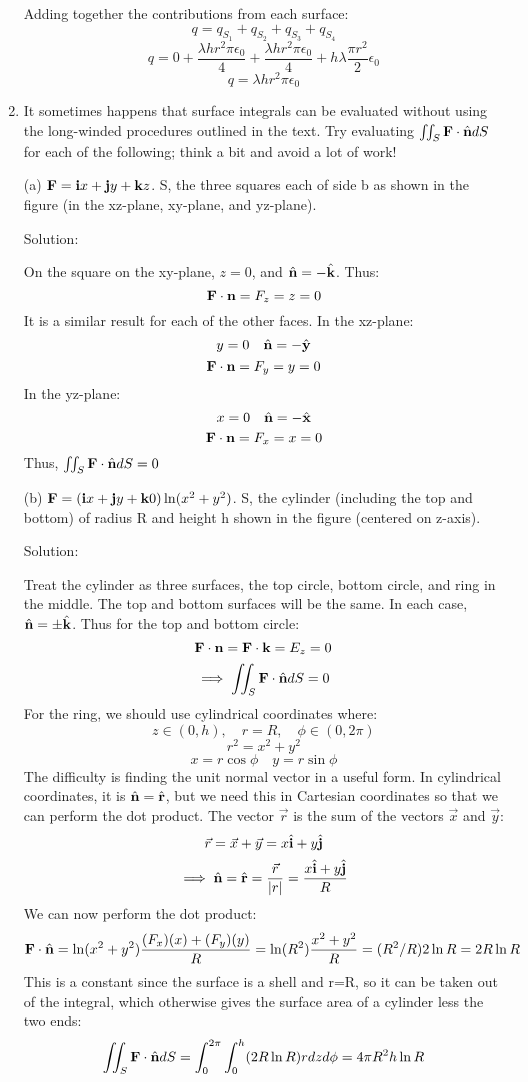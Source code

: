 \documentclass{article}
\begin{document}
\begin{enumerate}
    Adding together the contributions from each surface:
    \[ q = q_{S_1} + q_{S_2} + q_{S_3} + q_{S_4}\]
    \[ q = 0 + \frac{\lambda h r^2 \pi \epsilon_0}{4} + \frac{\lambda h r^2 \pi \epsilon_0}{4} + h \lambda \frac{\pi r^2}{2} \epsilon_0 \]
    \[ q = \lambda h r^2 \pi \epsilon_0 \]

    \item It sometimes happens that surface integrals can be evaluated without using the long-winded procedures outlined in the text.
    Try evaluating $\iint_S \textbf{F} \cdot \hat{\textbf{n}} dS$ for each of the following; think a bit and avoid a lot of work!

    (a) $\textbf{F} = \textbf{i}{x} + \textbf{j}{y} + \textbf{k}{z}$. S, the three squares each of side b as shown in the figure (in the xz-plane, xy-plane, and yz-plane).

    Solution:

    On the square on the xy-plane, $z=0$, and $\hat{\textbf{n}} = -\hat{\textbf{k}}$. Thus:
    \[ \textbf{F} \cdot \textbf{n} = F_z = z = 0 \]
    It is a similar result for each of the other faces. In the xz-plane:
    \[ y = 0 \quad \hat{\textbf{n}} = -\hat{\textbf{y}} \]
    \[ \textbf{F} \cdot \textbf{n} = F_y = y = 0 \]
    In the yz-plane:
    \[ x = 0 \quad \hat{\textbf{n}} = -\hat{\textbf{x}} \]
    \[ \textbf{F} \cdot \textbf{n} = F_x = x = 0 \]
    Thus, $\iint_S \textbf{F} \cdot \hat{\textbf{n}} dS = 0$

    (b) $\textbf{F} = (\textbf{i}{x} + \textbf{j}{y} + \textbf{k}{0})\ln(x^2 + y^2)$. S, the cylinder (including the top and bottom) of radius R and height h shown
    in the figure (centered on z-axis).

    Solution:

    Treat the cylinder as three surfaces, the top circle, bottom circle, and ring in the middle. The top and bottom surfaces will be the same.
    In each case, $\hat{\textbf{n}} = \pm \hat{\textbf{k}}$. Thus for the top and bottom circle:
    \[ \textbf{F} \cdot \textbf{n} = \textbf{F} \cdot \textbf{k} = E_z = 0 \]
    \[ \implies \iint_S \textbf{F} \cdot \hat{\textbf{n}} dS = 0 \]
    For the ring, we should use cylindrical coordinates where:
    \[ z \in (0,h), \quad r = R, \quad \phi \in (0,2\pi) \]
    \[ r^2 = x^2 + y^2 \]
    \[ x = r\cos\phi \quad y = r\sin\phi \]
    The difficulty is finding the unit normal vector in a useful form. In cylindrical coordinates, it is $\hat{\textbf{n}} = \hat{\textbf{r}}$, but we need this in
    Cartesian coordinates so that we can perform the dot product. The vector $\vec{r}$ is the sum of the vectors $\vec{x}$ and $\vec{y}$:
    \[ \vec{r} = \vec{x} + \vec{y} = x\hat{\textbf{i}} + y\hat{\textbf{j}} \]
    \[ \implies \hat{\textbf{n}} = \hat{\textbf{r}} = \frac{\vec{r}}{|r|} = \frac{x\hat{\textbf{i}} + y \hat{\textbf{j}}}{R} \]
    We can now perform the dot product:
    \[ \textbf{F} \cdot \hat{\textbf{n}} = \ln(x^2 + y^2)\frac{(F_x)(x) + (F_y)(y)}{R} = \ln(R^2)\frac{x^2 + y^2}{R} = (R^2/R)2\ln{R} = 2R\ln{R} \]
    This is a constant since the surface is a shell and r=R, so it can be taken out of the integral, which otherwise gives the surface area of a cylinder less the two ends:
    \[ \iint_S \textbf{F} \cdot \hat{\textbf{n}} dS = \int_0^{2\pi} \int_0^h (2R\ln{R}) r dz d\phi = 4\pi R^2 h \ln{R} \]


\end{enumerate}
\end{document}
